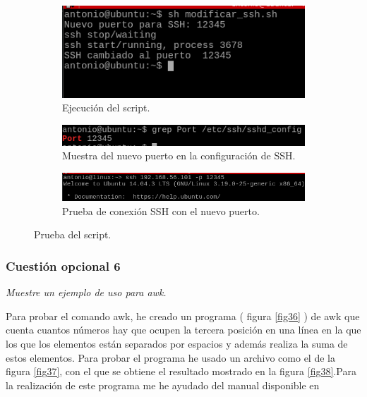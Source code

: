 \begin{figure}[H]
    \centering
    \begin{subfigure}[b]{0.72\textwidth}
        \includegraphics[width=\textwidth]{imagenes/img51}
        \caption{Ejecución del script.} 
    \end{subfigure}
   \begin{subfigure}[b]{0.8\textwidth}
        \includegraphics[width=\textwidth]{imagenes/img52}
        \caption{Muestra del nuevo puerto en la configuración de SSH.} 
    \end{subfigure}
    \begin{subfigure}[b]{0.8\textwidth}
        \includegraphics[width=\textwidth]{imagenes/img53}
        \caption{Prueba de conexión SSH con el nuevo puerto.} 
    \end{subfigure}
    \caption{Prueba del script.}  
    \label{fig48} 
\end{figure}
\subsubsection{Cuestión opcional 6}
\textit{Muestre un ejemplo de uso para awk.}
\newline

Para probar el comando awk, he creado un programa ( figura \ref{fig36} ) de awk que cuenta cuantos números hay que ocupen la tercera posición en una línea en la que los que los elementos están separados por espacios y además realiza la suma de estos elementos. Para probar el programa he usado un archivo como el de la figura \ref{fig37}, con el que se obtiene el resultado mostrado en la figura \ref{fig38}.Para la realización de este programa me he ayudado del manual disponible en \cite{awk}


